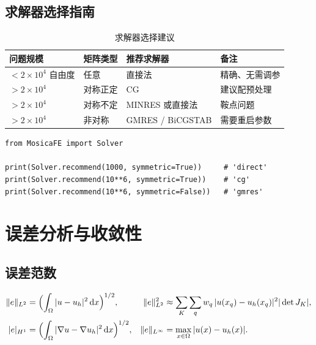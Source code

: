 \documentclass[UTF8,11pt,oneside]{ctexbook}
\theoremstyle{definition}
\theoremstyle{plain}
\newcommand{\dif}{\,\mathrm{d}}
\begin{document}
\section{求解器选择指南}

\begin{table}[htbp]
\centering
\caption{求解器选择建议}
\label{tab:solver-guide}
\begin{lrbox}{\guideTableBox}
\begin{tabular}{@{}llll@{}}
\toprule
问题规模 & 矩阵类型 & 推荐求解器 & 备注 \\
\midrule
$<2\times10^4$ 自由度 & 任意 & 直接法 & 精确、无需调参 \\
$>2\times10^4$ & 对称正定 & CG & 建议配预处理 \\
$>2\times10^4$ & 对称不定 & MINRES 或直接法 & 鞍点问题 \\
$>2\times10^4$ & 非对称 & GMRES / BiCGSTAB & 需要重启参数 \\
\bottomrule
\end{tabular}
\end{lrbox}%
\ifdim\wd\guideTableBox>\linewidth
  \resizebox{\linewidth}{!}{\usebox{\guideTableBox}}%
\else\usebox{\guideTableBox}\fi
\end{table}

\begin{lstlisting}[language=MosicaFE,caption={示例 7.2：自动选择}]
from MosicaFE import Solver

print(Solver.recommend(1000, symmetric=True))     # 'direct'
print(Solver.recommend(10**6, symmetric=True))    # 'cg'
print(Solver.recommend(10**6, symmetric=False))   # 'gmres'
\end{lstlisting}

\chapter{误差分析与收敛性}
\label{chap:error}

\section{误差范数}

\begin{align}
\|e\|_{L^2}&=\Bigl(\int_\Omega|u-u_h|^2\dif x\Bigr)^{1/2},&
\|e\|_{L^2}^2&\approx\sum_K\sum_q w_q\,|u(x_q)-u_h(x_q)|^2|\det J_K|,
\label{eq:l2norm}\\
|e|_{H^1}&=\Bigl(\int_\Omega|\nabla u-\nabla u_h|^2\dif x\Bigr)^{1/2},&
\|e\|_{L^\infty}&=\max_{x\in\Omega}|u(x)-u_h(x)| .
\label{eq:h1norm}
\end{align}
\end{document}
